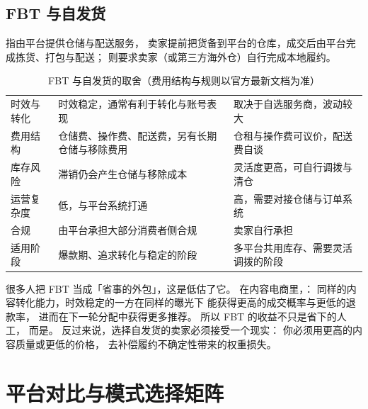 \subsection{FBT 与自发货}

 指由平台提供仓储与配送服务，
卖家提前把货备到平台的仓库，成交后由平台完成拣货、打包与配送；
则要求卖家（或第三方海外仓）自行完成本地履约。

\begin{table}[htbp]
\centering
\caption{FBT 与自发货的取舍（费用结构与规则以官方最新文档为准）}
\label{tab:tt-fulfil}
\small
\begin{tabularx}{\textwidth}{L{2.5cm} Y Y}
\toprule
{} &  &  \\
\midrule
时效与转化 & 时效稳定，通常有利于转化与账号表现 & 取决于自选服务商，波动较大 \\
\addlinespace
费用结构 & 仓储费、操作费、配送费，另有长期仓储与移除费用 & 仓租与操作费可议价，配送费自谈 \\
\addlinespace
库存风险 & 滞销仍会产生仓储与移除成本 & 灵活度更高，可自行调拨与清仓 \\
\addlinespace
运营复杂度 & 低，与平台系统打通 & 高，需要对接仓储与订单系统 \\
\addlinespace
合规 & 由平台承担大部分消费者侧合规 & 卖家自行承担 \\
\addlinespace
适用阶段 & 爆款期、追求转化与稳定的阶段 & 多平台共用库存、需要灵活调拨的阶段 \\
\bottomrule
\end{tabularx}
\end{table}

\begin{insight}
很多人把 FBT 当成「省事的外包」，这是低估了它。
在内容电商里，：
同样的内容转化能力，时效稳定的一方在同样的曝光下
能获得更高的成交概率与更低的退款率，
进而在下一轮分配中获得更多推荐。
所以 FBT 的收益不只是省下的人工，
而是。
反过来说，选择自发货的卖家必须接受一个现实：
你必须用更高的内容质量或更低的价格，
去补偿履约不确定性带来的权重损失。
\end{insight}

\section{平台对比与模式选择矩阵}
\label{sec:plat-matrix}

